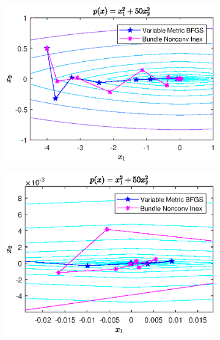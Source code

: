 \begin{figure}[H]
\begin{subfigure}[t]{0.49\textwidth}
		\includegraphics[width=\textwidth]{Pictures/Plots/final_nonsm_parab.eps}
\end{subfigure}
\begin{subfigure}[t]{0.49\textwidth}
	\begin{center}
		\includegraphics[width=\textwidth]{Pictures/Plots/final_nonsm_parab_detail.eps}
	\end{center}
\end{subfigure}
\caption{}
\label{Im_Nonsm_Parab}
\end{figure}

